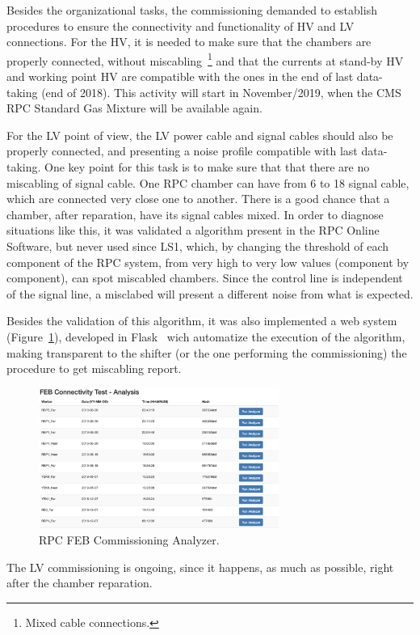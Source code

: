 Besides the organizational tasks, the commissioning demanded to establish procedures to ensure the connectivity and functionality of HV and LV connections. For the HV, it is needed to make sure that the chambers are properly connected, without miscabling~\footnote{Mixed cable connections.} and that the currents at stand-by HV  and working point HV are compatible with the ones in the end of last data-taking (end of 2018). This activity will start in November/2019, when the CMS RPC Standard Gas Mixture will be available again.
 
For the LV point of view, the LV power cable and signal cables should also be properly connected, and presenting a noise profile compatible with last data-taking. One key point for this task is to make sure that that there are no miscabling of signal cable. One RPC chamber can have from 6 to 18 signal cable, which are connected very close one to another. There is a good chance that a chamber, after reparation, have its signal cables mixed. In order to diagnose situations like this, it was validated a algorithm present in the RPC Online Software, but never used since LS1, which, by changing the threshold of each component of the RPC system, from very high to very low values (component by component), can spot miscabled chambers. Since the control line is independent of the signal line, a misclabed will present a different noise from what is expected.

Besides the validation of this algorithm, it was also implemented a web system (Figure~\ref{comm}), developed in Flask~\cite{flask} wich automatize the execution of the algorithm, making transparent to the shifter (or the one performing the commissioning) the procedure to get miscabling report.

\begin{figure}[h]
\begin{center}
\includegraphics[width=0.7\textwidth,keepaspectratio]{figures/rpc/comm.png}
\end{center}
\caption{RPC FEB Commissioning Analyzer.}\label{comm}
\end{figure}

The LV commissioning is ongoing, since it happens, as much as possible, right after the chamber reparation.

\clearpage